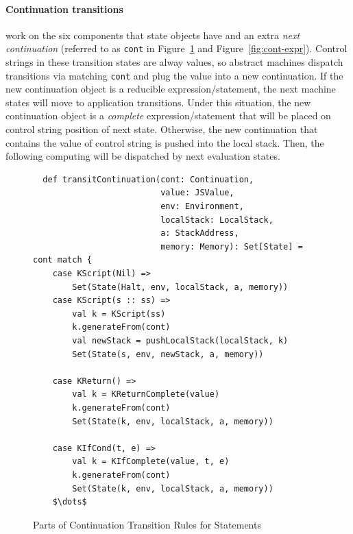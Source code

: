 \documentclass{article}
\begin{document}
\paragraph{Continuation transitions}work on the six components that state objects have and an extra \emph{next continuation} (referred to as \verb|cont| in Figure~\ref{fig:cont-stmt} and Figure~\ref{fig:cont-expr}).
Control strings in these transition states are alway values, so abstract machines dispatch transitions via matching \verb|cont| and plug the value into a new continuation.
If the new continuation object is a reducible expression/statement, the next machine states will move to application transitions.
Under this situation, the new continuation object is a \emph{complete} expression/statement that will be placed on control string position of next state.
Otherwise, the new continuation that contains the value of control string is pushed into the local stack.
Then, the following computing will be dispatched by next evaluation states.

\begin{figure}
\lstset{language=Scala, mathescape}
\begin{lstlisting}
  def transitContinuation(cont: Continuation,
                          value: JSValue,
                          env: Environment,
                          localStack: LocalStack,
                          a: StackAddress,
                          memory: Memory): Set[State] = cont match {
    case KScript(Nil) =>
        Set(State(Halt, env, localStack, a, memory))
    case KScript(s :: ss) =>
        val k = KScript(ss)
        k.generateFrom(cont)
        val newStack = pushLocalStack(localStack, k)
        Set(State(s, env, newStack, a, memory))

    case KReturn() =>
        val k = KReturnComplete(value)
        k.generateFrom(cont)
        Set(State(k, env, localStack, a, memory))

    case KIfCond(t, e) =>
        val k = KIfComplete(value, t, e)
        k.generateFrom(cont)
        Set(State(k, env, localStack, a, memory))
    $\dots$
\end{lstlisting}
\caption{Parts of Continuation Transition Rules for Statements}
\label{fig:cont-stmt}
\end{figure}
\end{document}
